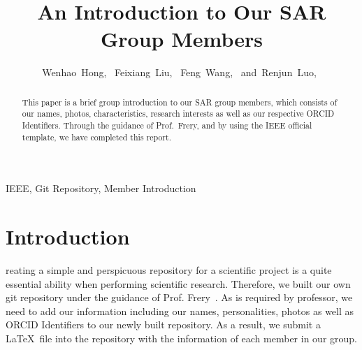 \documentclass[journal]{IEEEtran}
\begin{document}
\title{An Introduction to Our SAR Group Members}

\author{Wenhao~Hong,~
        Feixiang~Liu,~
        Feng~Wang,~
        and~Renjun~Luo,~%
}






\maketitle

\begin{abstract}
	This paper is a brief group introduction to our SAR group members, which consists of our names, photos, characteristics, research interests as well as our respective ORCID Identifiers. Through the guidance of Prof.\ Frery, and by using the IEEE official template, we have completed this report.
\end{abstract}

\begin{IEEEkeywords}
IEEE, Git Repository, Member Introduction
\end{IEEEkeywords}




\IEEEpeerreviewmaketitle



\section{Introduction}


reating a simple and perspicuous repository for a scientific project is a quite essential ability when performing scientific research. Therefore, we built our own git repository under the guidance of Prof. Frery~\cite{2020A}.
As is required by professor, we need to add our information including our names, personalities, photos as well as ORCID Identifiers to our newly built repository.
As a result, we submit a \LaTeX\ file into the repository with the information of each member in our group.
\end{document}
